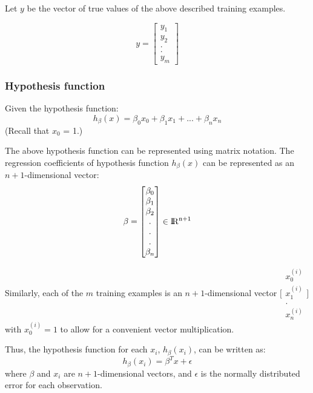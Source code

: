 \documentclass{article}
\begin{document}
	Let $y$ be the vector of true values of the above described training examples.
	
	\begin{equation*}
	y=\begin{bmatrix}
	y_1\\y_2\\.\\.\\y_m
	\end{bmatrix}
	\end{equation*}
	
	\subsubsection{Hypothesis function}
	Given the hypothesis function:
	$$
	h_\beta(x)=\beta_0x_0+\beta_1x_1+...+\beta_nx_n
	$$
	(Recall that $x_0$ = 1.)
	
	The above hypothesis function can be represented using matrix notation. The regression coefficients of hypothesis function $h_
	\beta(x)$ can be represented as an $n+1$-dimensional vector:
	\begin{equation*}
	\beta=\begin{bmatrix}
	\beta_0\\\beta_1\\\beta_2\\.\\.\\.\\\beta_n
	\end{bmatrix}\in\rm I\!R^{n+1}
	\end{equation*}
	
	Similarly, each of the $m$ training examples is an $n+1$-dimensional vector $\Bigg[\begin{smallmatrix}
	x^{(i)}_0\\x^{(i)}_1\\.\\x^{(i)}_n
	\end{smallmatrix}\Bigg]$ with $x^{(i)}_0=1$ to allow for a convenient vector multiplication.
	
	Thus, the hypothesis function for each $x_i$, $h_\beta(x_i)$, can be written as:
	\begin{equation*}
	h_\beta(x_i)=\beta^{T}x+\epsilon
	\end{equation*}
	where $\beta$ and $x_i$ are $n+1$-dimensional vectors, and $\epsilon$ is the normally distributed error for each observation.
	
\end{document}
